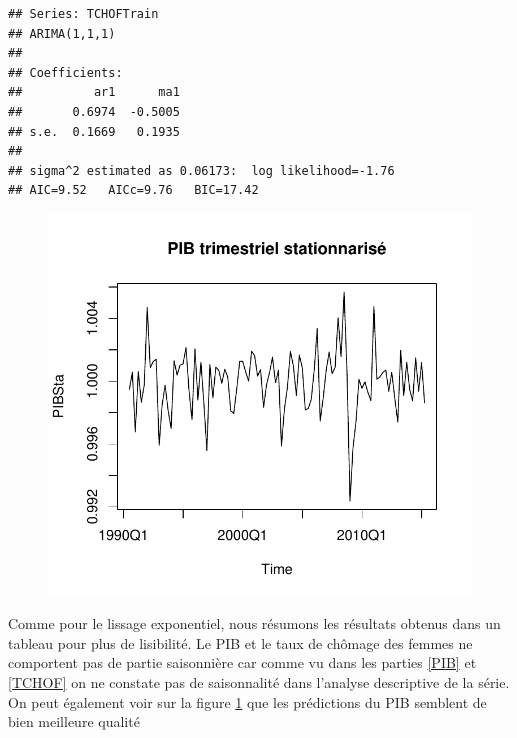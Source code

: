 \documentclass[11pt,]{article}
\newenvironment{Shaded}{\begin{snugshade}}{\end{snugshade}}
\newcommand{\KeywordTok}[1]{\textcolor[rgb]{0.13,0.29,0.53}{\textbf{#1}}}
\newcommand{\DataTypeTok}[1]{\textcolor[rgb]{0.13,0.29,0.53}{#1}}
\newcommand{\DecValTok}[1]{\textcolor[rgb]{0.00,0.00,0.81}{#1}}
\newcommand{\FloatTok}[1]{\textcolor[rgb]{0.00,0.00,0.81}{#1}}
\newcommand{\StringTok}[1]{\textcolor[rgb]{0.31,0.60,0.02}{#1}}
\newcommand{\OperatorTok}[1]{\textcolor[rgb]{0.81,0.36,0.00}{\textbf{#1}}}
\newcommand{\NormalTok}[1]{#1}
\begin{document}
\begin{verbatim}
## Series: TCHOFTrain 
## ARIMA(1,1,1) 
## 
## Coefficients:
##          ar1      ma1
##       0.6974  -0.5005
## s.e.  0.1669   0.1935
## 
## sigma^2 estimated as 0.06173:  log likelihood=-1.76
## AIC=9.52   AICc=9.76   BIC=17.42
\end{verbatim}

\begin{Shaded}
\end{Shaded}

\begin{figure}
\centering
\includegraphics{doc_files/figure-latex/unnamed-chunk-15-1.pdf}
\caption{\label{fig13}}
\end{figure}

Comme pour le lissage exponentiel, nous résumons les résultats obtenus
dans un tableau pour plus de lisibilité. Le PIB et le taux de chômage
des femmes ne comportent pas de partie saisonnière car comme vu dans les
parties \ref{PIB} et \ref{TCHOF} on ne constate pas de saisonnalité dans
l'analyse descriptive de la série. On peut également voir sur la figure
\ref{fig13} que les prédictions du PIB semblent de bien meilleure
qualité
\end{document}
